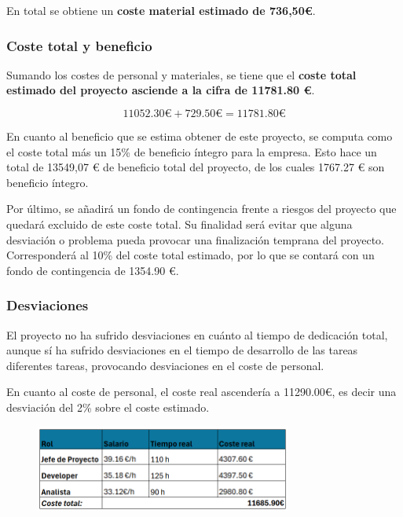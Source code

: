 En total se obtiene un \textbf{coste material estimado de 736,50€}.

\subsubsection{Coste total y beneficio}

Sumando los costes de personal y materiales, se tiene que el \textbf{coste total estimado del proyecto asciende a la cifra de 11781.80 €}.

\begin{equation}
    11052.30\text{€} + 729.50\text{€} =  11781.80 \text{€}
\end{equation}

En cuanto al beneficio que se estima obtener de este proyecto, se computa como el coste total más un 15\% de beneficio íntegro para la empresa. Esto hace un total de 13549,07 € de beneficio total del proyecto, de los cuales 1767.27 € son beneficio íntegro.

Por último, se añadirá un fondo de contingencia frente a riesgos del proyecto que quedará excluido de este coste total. Su finalidad será evitar que alguna desviación o problema pueda provocar una finalización temprana del proyecto. Corresponderá al 10\% del coste total estimado, por lo que se contará con un fondo de contingencia de 1354.90 €.

\subsubsection{Desviaciones}

El proyecto no ha sufrido desviaciones en cuánto al tiempo de dedicación total, aunque sí ha sufrido desviaciones en el tiempo de desarrollo de las tareas diferentes tareas, provocando desviaciones en el coste de personal.

En cuanto al coste de personal, el coste real ascendería a 11290.00€, es decir una desviación del 2\% sobre el coste estimado.%

\begin{figure}[H]
    \centering
    \includegraphics[width=0.75\textwidth]{tables/costeRealcap.png}
    \label{table:costeRealcap}
\end{figure}


